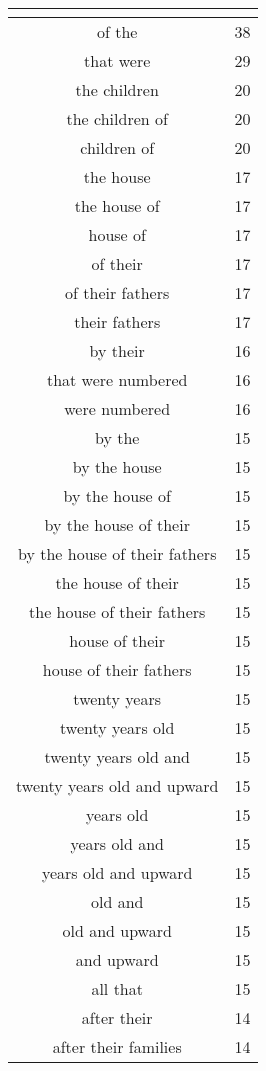 \begin{center}
\begin{longtable}{|c|c|}
\hline \multicolumn{2}{c}{{ }} \\ \hline
\endfoot 
of the & 38\\ \hline 
that were & 29\\ \hline 
the children & 20\\ \hline 
the children of & 20\\ \hline 
children of & 20\\ \hline 
the house & 17\\ \hline 
the house of & 17\\ \hline 
house of & 17\\ \hline 
of their & 17\\ \hline 
of their fathers & 17\\ \hline 
their fathers & 17\\ \hline 
by their & 16\\ \hline 
that were numbered & 16\\ \hline 
were numbered & 16\\ \hline 
by the & 15\\ \hline 
by the house & 15\\ \hline 
by the house of & 15\\ \hline 
by the house of their & 15\\ \hline 
by the house of their fathers & 15\\ \hline 
the house of their & 15\\ \hline 
the house of their fathers & 15\\ \hline 
house of their & 15\\ \hline 
house of their fathers & 15\\ \hline 
twenty years & 15\\ \hline 
twenty years old & 15\\ \hline 
twenty years old and & 15\\ \hline 
twenty years old and upward & 15\\ \hline 
years old & 15\\ \hline 
years old and & 15\\ \hline 
years old and upward & 15\\ \hline 
old and & 15\\ \hline 
old and upward & 15\\ \hline 
and upward & 15\\ \hline 
all that & 15\\ \hline 
after their & 14\\ \hline 
after their families & 14\\ \hline 

\end{longtable}
\end{center}
